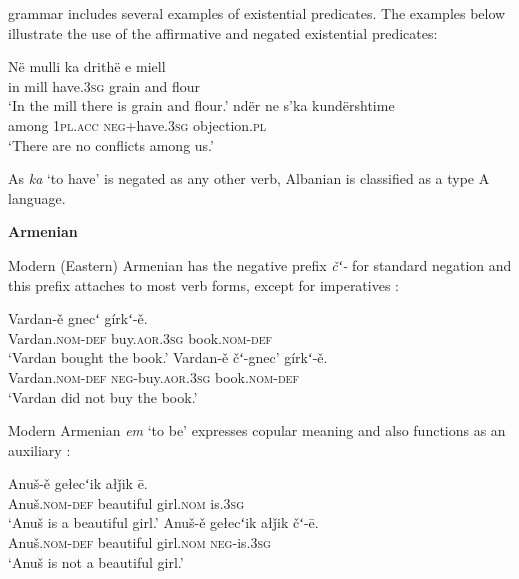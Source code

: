 ﻿\documentclass[output=paper]{langsci/langscibook}
\begin{document}
\begin{unindented}
 grammar includes several examples of existential predicates. The examples below illustrate the use of the affirmative and negated existential predicates:
%
\begin{exe}\ex \gll Në mulli ka drithë e miell \\
in mill have.\textsc{3sg} grain and flour \\
    \glt `In the mill there is grain and flour.' \parencite[12/257]{Camaj1984}
\ex \gll ndër ne s’ka kundërshtime \\
among \textsc{1pl}.\textsc{acc} \textsc{neg}+have.\textsc{3sg} objection.\textsc{pl} \\
    \glt `There are no conflicts among us.' \citep[70]{Camaj1984}
    \end{exe} 

As \textit{ka} `to have' is negated as any other verb, Albanian is classified as a type A language. 

\textbf{Armenian}

Modern (Eastern) Armenian has the negative prefix \textit{čʻ-} for standard
negation and this prefix attaches to most verb forms, except for
imperatives \parencite[522]{DumTragut2009}:
%
\begin{exe}\ex \gll Vardan-ě gnecʻ gírkʻ-ě.  \\
Vardan.\textsc{nom}-\textsc{def} buy.\textsc{aor}.\textsc{3sg} book.\textsc{nom-def} \\
    \glt `Vardan bought the book.' \parencite[51]{DumTragut2009}
\ex \gll Vardan-ě čʻ-gnec’ gírkʻ-ě.  \\
Vardan.\textsc{nom}-\textsc{def} \textsc{neg}-buy.\textsc{aor}.\textsc{3sg} book.\textsc{nom-def} \\
    \glt `Vardan did not buy the book.' \parencite[51]{DumTragut2009}
    \end{exe} 

Modern Armenian \textit{em} `to be' expresses copular meaning and also
functions as an auxiliary \parencite[215]{DumTragut2009}:

\begin{exe}\ex \gll Anuš-ě gełecʻik   ałǰik ē. \\
Anuš.\textsc{nom}-\textsc{def} beautiful girl.\textsc{nom} is.\textsc{3sg} \\
    \glt `Anuš is a beautiful girl.' \parencite[215]{DumTragut2009}
\ex \gll Anuš-ě gełecʻik ałǰik čʻ-ē.  \\
Anuš.\textsc{nom}-\textsc{def} beautiful girl.\textsc{nom} \textsc{neg}-is.\textsc{3sg} \\
    \glt `Anuš is not a beautiful girl.' \parencite[215]{DumTragut2009}
    \end{exe}


\end{unindented}
\end{document}
